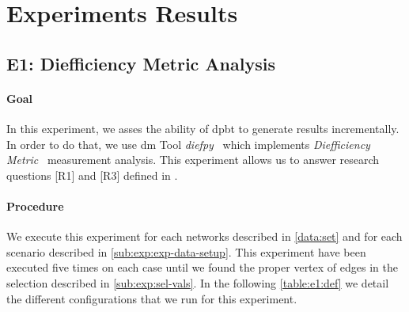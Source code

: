 \section{Experiments Results}\label{sec:exp:observed-results}\label{sub:exp:exp-def}
\subsection{E1: Diefficiency Metric Analysis}\label{sub:sec:exp-1} 
\paragraph{Goal} In this experiment, we asses the ability of \acrshort{dpbt} to generate results incrementally.
In order to do that, we use \acrfull{dm} Tool \emph{diefpy}~\cite{diefpy} which implements \emph{Diefficiency Metric}~\cite{diefpaper} measurement analysis.
This experiment allows us to answer research questions [R1] and [R3] defined in . 

\paragraph{Procedure} We execute this experiment for each networks described in \autoref{data:set} and for each scenario described in \autoref{sub:exp:exp-data-setup}.
This experiment have been executed five times on each case until we found the proper vertex of edges in the selection described in \autoref{sub:exp:sel-vals}.
In the following \autoref{table:e1:def} we detail the different configurations that we run for this experiment.

